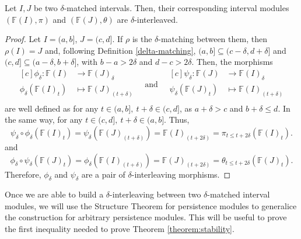 \begin{lemma} \label{lemma:interval-interleaving-if-matching}
    Let $ I, J $ be two $\delta$-matched intervals. Then, their corresponding interval modules $ (\mathbb F (I), \pi) $ and $( \mathbb F (J), \theta) $ are $\delta$-interleaved.
\end{lemma}
\begin{proof}
    Let $ I = (a, b] $, $ J = (c, d] $. If $\rho$ is the $\delta$-matching between them, then $ \rho(I) = J $ and, following Definition \ref{delta-matching}, $ (a, b] \subseteq (c-\delta, d+\delta] $ and $ (c, d] \subseteq (a-\delta, b+\delta] $, with $ b - a > 2\delta $ and $ d - c > 2\delta $. Then, the morphisms
    \begin{equation*}
        \begin{aligned}[c]
        \phi_\delta\colon \mathbb F(I) &\to \mathbb F(J)_\delta\\
        \phi_\delta(\mathbb F(I)_t) &\mapsto \mathbb F(J)_{(t+\delta)}\\
        \end{aligned}
        \quad \text{and} \quad
        \begin{aligned}[c]
        \psi_\delta\colon \mathbb F(J) &\to \mathbb F(I)_\delta\\
        \psi_\delta(\mathbb F(J)_t) &\mapsto \mathbb F(I)_{(t+\delta)}\\
        \end{aligned}
    \end{equation*}
    are well defined as for any $ t \in (a,b], \ t + \delta \in (c, d] $, as $ a + \delta > c $ and $ b + \delta \leq d $. In the same way, for any $ t \in (c,d], \ t + \delta \in (a, b] $. Thus,
    \begin{equation}
        \psi_\delta \circ \phi_\delta (\mathbb F(I)_t) = \psi_\delta(\mathbb F(J)_{(t+\delta)}) = \mathbb F(I)_{(t+2\delta)} = \pi_{t \leq t+2\delta}(\mathbb F(I)_t).
    \end{equation}
    and
    \begin{equation}
        \phi_\delta \circ \psi_\delta (\mathbb F(J)_t) = \phi_\delta(\mathbb F(I)_{(t+\delta)}) = \mathbb F(J)_{(t+2\delta)} = \theta_{t \leq t+2\delta}(\mathbb F(J)_t).
    \end{equation}
    Therefore, $ \phi_\delta $ and $ \psi_\delta $ are a pair of $\delta$-interleaving morphisms.
\end{proof}

Once we are able to build a $\delta$-interleaving between two $\delta$-matched interval modules, we will use the Structure Theorem for persistence modules to generalice the construction for arbitrary persistence modules. This will be useful to prove the first inequality needed to prove Theorem \ref{theorem:stability}.

